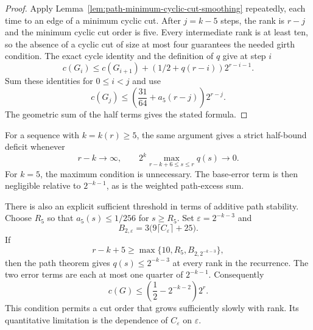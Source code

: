 \begin{proof}
Apply Lemma~\ref{lem:path-minimum-cyclic-cut-smoothing} repeatedly, each time to an edge of a minimum cyclic cut.
After $j=k-5$ steps, the rank is $r-j$ and the minimum cyclic cut order is five.
Every intermediate rank is at least ten, so the absence of a cyclic cut of size at most four guarantees the needed girth condition.
The exact cycle identity and the definition of $q$ give at step $i$
\[
 c(G_i)\le c(G_{i+1})+(1/2+q(r-i))2^{r-i-1}.
\]
Sum these identities for $0\le i<j$ and use
\[
 c(G_j)\le\left(\frac{31}{64}+a_5(r-j)\right)2^{r-j}.
\]
The geometric sum of the half terms gives the stated formula.
\end{proof}

For a sequence with $k=k(r)\ge5$, the same argument gives a strict half-bound deficit whenever
\[
 r-k\longrightarrow\infty,
 \qquad
 2^k\max_{r-k+6\le s\le r}q(s)\longrightarrow0.
\]
For $k=5$, the maximum condition is unnecessary.
The base-error term is then negligible relative to $2^{-k-1}$, as is the weighted path-excess sum.

There is also an explicit sufficient threshold in terms of additive path stability.
Choose $R_5$ so that $a_5(s)\le1/256$ for $s\ge R_5$.
Set $\varepsilon=2^{-k-3}$ and
\[
 B_{2,\varepsilon}=3\bigl(9\lceil C_\varepsilon\rceil+25\bigr).
\]
If
\[
 r-k+5\ge\max\{10,R_5,B_{2,2^{-k-3}}\},
\]
then the path theorem gives $q(s)\le2^{-k-3}$ at every rank in the recurrence.
The two error terms are each at most one quarter of $2^{-k-1}$.
Consequently
\[
 c(G)\le\left(\frac12-2^{-k-2}\right)2^r.
\]
This condition permits a cut order that grows sufficiently slowly with rank.
Its quantitative limitation is the dependence of $C_\varepsilon$ on $\varepsilon$.
